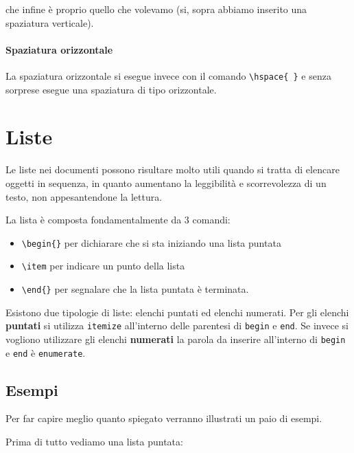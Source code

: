 \vspace{25px}

\noindent che infine è proprio quello che volevamo (si, sopra abbiamo inserito 
una spaziatura verticale).

\paragraph*{Spaziatura orizzontale} La spaziatura orizzontale si esegue invece 
con il comando \verb!\hspace{ }! e senza sorprese esegue una spaziatura di tipo 
orizzontale.

\section{Liste}

Le liste nei documenti possono risultare molto utili quando si tratta di 
elencare oggetti in sequenza, in quanto aumentano la leggibilità e 
scorrevolezza di un testo, non appesantendone la lettura.

La lista è composta fondamentalmente da 3 comandi:
\begin{itemize}
 \item \verb!\begin{}! per dichiarare che si sta iniziando una 
lista puntata
 \item \verb!\item! per indicare un punto della lista
 \item \verb!\end{}! per segnalare che la lista puntata è terminata.
\end{itemize}

Esistono due tipologie di liste: elenchi puntati ed elenchi numerati. Per gli 
elenchi \textbf{puntati} si utilizza \texttt{itemize} all'interno delle 
parentesi di \texttt{begin} e \texttt{end}. Se invece si vogliono utilizzare 
gli elenchi \textbf{numerati} la parola da inserire all'interno di 
\texttt{begin} e 
\texttt{end} è \texttt{enumerate}.

\subsection{Esempi}

Per far capire meglio quanto spiegato verranno illustrati un paio di esempi.

\noindent Prima di tutto vediamo una lista puntata:


